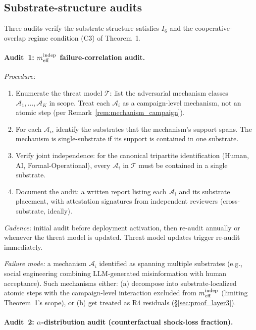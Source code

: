 \subsection{Substrate-structure audits}
\label{sec:tooling_substrate_audits}

Three audits verify the substrate structure satisfies $I_6$ and
the cooperative-overlap regime condition (C3) of Theorem~1.

\paragraph{Audit~1: $m_{\mathrm{eff}}^{\mathrm{indep}}$ failure-correlation audit.}

\emph{Procedure:}
\begin{enumerate}
\item Enumerate the threat model $\mathcal{T}$: list the adversarial
  mechanism classes $\mathcal{A}_1, \ldots, \mathcal{A}_K$ in scope.
  Treat each $\mathcal{A}_i$ as a campaign-level mechanism, not an
  atomic step (per Remark~\ref{rem:mechanism_campaign}).
\item For each $\mathcal{A}_i$, identify the substrates that the
  mechanism's support spans. The mechanism is single-substrate if
  its support is contained in one substrate.
\item Verify joint independence: for the canonical tripartite
  identification (Human, AI, Formal-Operational), every $\mathcal{A}_i$
  in $\mathcal{T}$ must be contained in a single substrate.
\item Document the audit: a written report listing each
  $\mathcal{A}_i$ and its substrate placement, with attestation
  signatures from independent reviewers (cross-substrate, ideally).
\end{enumerate}

\emph{Cadence:} initial audit before deployment activation, then
re-audit annually or whenever the threat model is updated. Threat
model updates trigger re-audit immediately.

\emph{Failure mode:} a mechanism $\mathcal{A}_i$ identified as
spanning multiple substrates (e.g., social engineering combining
LLM-generated misinformation with human acceptance). Such mechanisms
either: (a) decompose into substrate-localized atomic steps with the
campaign-level interaction excluded from $m_{\mathrm{eff}}^{\mathrm{indep}}$ (limiting Theorem~1's
scope), or (b) get treated as R4 residuals
(\S\ref{sec:proof_layer3}).

\paragraph{Audit~2: $\alpha$-distribution audit (counterfactual
shock-loss fraction).}

